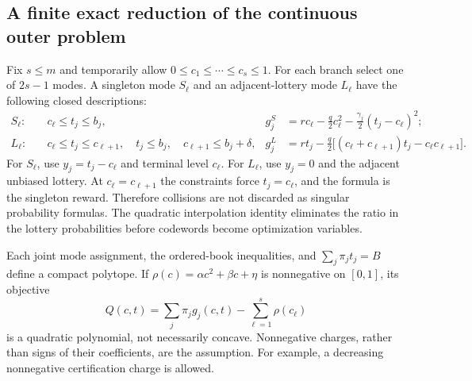 \subsection{A finite exact reduction of the continuous outer problem}
Fix $s\leq m$ and temporarily allow $0\leq c_1\leq\cdots\leq c_s\leq1$. For each branch select one of $2s-1$ modes. A singleton mode $S_\ell$ and an adjacent-lottery mode $L_\ell$ have the following closed descriptions:
\begin{align}
 S_\ell:\quad&c_\ell\leq t_j\leq b_j,
 &g_j^S&=rc_\ell-\frac q2c_\ell^2-\frac{\gamma_j}{2}(t_j-c_\ell)^2;\label{eq:singleton-cell}\\
 L_\ell:\quad&c_\ell\leq t_j\leq c_{\ell+1},\quad t_j\leq b_j,\quad
 c_{\ell+1}\leq b_j+\delta,
 &g_j^L&=rt_j-\frac q2\bigl[(c_\ell+c_{\ell+1})t_j-c_\ell c_{\ell+1}\bigr].\label{eq:lottery-cell}
\end{align}
For $S_\ell$, use $y_j=t_j-c_\ell$ and terminal level $c_\ell$. For $L_\ell$, use $y_j=0$ and the adjacent unbiased lottery. At $c_\ell=c_{\ell+1}$ the constraints force $t_j=c_\ell$, and the formula is the singleton reward. Therefore collisions are not discarded as singular probability formulas. The quadratic interpolation identity eliminates the ratio in the lottery probabilities before codewords become optimization variables.

Each joint mode assignment, the ordered-book inequalities, and $\sum_j\pi_jt_j=B$ define a compact polytope. If $\rho(c)=\alpha c^2+\beta c+\eta$ is nonnegative on $[0,1]$, its objective
\begin{equation}\label{eq:cell-objective}
 Q(c,t)=\sum_j\pi_jg_j(c,t)-\sum_{\ell=1}^s\rho(c_\ell)
\end{equation}
is a quadratic polynomial, not necessarily concave. Nonnegative charges, rather than signs of their coefficients, are the assumption. For example, a decreasing nonnegative certification charge is allowed.

